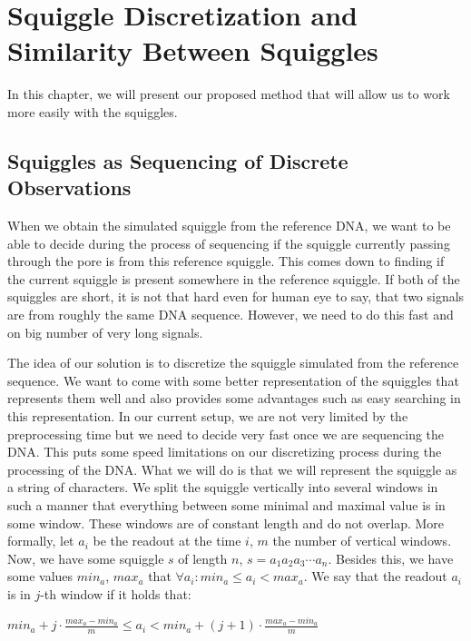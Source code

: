 \chapter{Squiggle Discretization and Similarity Between Squiggles}

\label{kap:proposedMethod}

In this chapter, we will present our proposed method that will allow us to work
more easily with the squiggles.

\section{Squiggles as Sequencing of Discrete Observations}

When we obtain the simulated squiggle from the reference DNA, we want to be able
to decide during the process of sequencing if the squiggle currently passing
through the pore is from this reference squiggle. This comes down to finding if the
current squiggle is present somewhere in the reference squiggle. If both of the squiggles
are short, it is not that hard even for human eye to say, that two signals are from
roughly the same DNA sequence. However, we need to do this fast and on big number
of very long signals.

The idea of our solution is to discretize the squiggle simulated from the
reference sequence. We want to come with some better representation of the
squiggles that represents them well and also provides some advantages such as
easy searching in this representation. In our current setup, we are
not very limited by the preprocessing time but we need to decide very fast once
we are sequencing the DNA. This puts some speed limitations on our discretizing
process during the processing of the DNA. What we will do is that we will
represent the squiggle as a string of characters. We split the squiggle vertically into several
windows in such a manner that everything between some minimal and maximal
value is in some window. These windows are of constant length and do not
overlap. More formally, let $a_i$ be the readout at the time $i$, $m$ the number of
vertical windows. Now, we have some squiggle $s$ of length $n$, $s=a_1a_2a_3\cdots a_n$.
Besides this, we have some values $min_a$, $max_a$ that $\forall a_i: min_a \leq a_i < max_a$.
We say that the readout $a_i$ is in $j$-th window if it holds that:

\begin{center}
$min_a + j\cdot \frac{max_a-min_a}{m} \leq a_i < min_a + (j+1)\cdot \frac{max_a-min_a}{m}$
\end{center}

